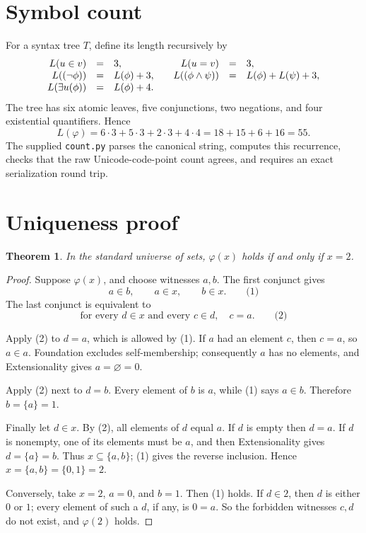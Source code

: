 \documentclass[10pt]{article}
\newtheorem{theorem}{Theorem}
\begin{document}
\section{Symbol count}

For a syntax tree $T$, define its length recursively by
\[
\begin{array}{rcl@{\qquad}rcl}
L(u\in v)&=&3, & L(u=v)&=&3,\\
L((\neg\phi))&=&L(\phi)+3,&
L((\phi\wedge\psi))&=&L(\phi)+L(\psi)+3,\\
L(\exists u(\phi))&=&L(\phi)+4.&&
\end{array}
\]
The tree has six atomic leaves, five conjunctions, two negations, and four
existential quantifiers.  Hence
\[
  L(\varphi)=6\cdot3+5\cdot3+2\cdot3+4\cdot4
             =18+15+6+16=\boxed{55}.
\]
The supplied \texttt{count.py} parses the canonical string, computes this
recurrence, checks that the raw Unicode-code-point count agrees, and requires
an exact serialization round trip.

\section{Uniqueness proof}

\begin{theorem}
In the standard universe of sets, $\varphi(x)$ holds if and only if $x=2$.
\end{theorem}

\begin{proof}
Suppose $\varphi(x)$, and choose witnesses $a,b$.  The first conjunct gives
\[
  a\in b,\qquad a\in x,\qquad b\in x. \qquad\text{(1)}
\]
The last conjunct is equivalent to
\[
  \text{for every }d\in x\text{ and every }c\in d,\quad c=a.
  \qquad\text{(2)}
\]

Apply (2) to $d=a$, which is allowed by (1).  If $a$ had an element $c$,
then $c=a$, so $a\in a$.  Foundation excludes self-membership; consequently
$a$ has no elements, and Extensionality gives $a=\varnothing=0$.

Apply (2) next to $d=b$.  Every element of $b$ is $a$, while (1) says
$a\in b$.  Therefore $b=\{a\}=1$.

Finally let $d\in x$.  By (2), all elements of $d$ equal $a$.  If $d$ is
empty then $d=a$.  If $d$ is nonempty, one of its elements must be $a$, and
then Extensionality gives $d=\{a\}=b$.  Thus $x\subseteq\{a,b\}$; (1) gives
the reverse inclusion.  Hence $x=\{a,b\}=\{0,1\}=2$.

Conversely, take $x=2$, $a=0$, and $b=1$.  Then (1) holds.  If $d\in2$,
then $d$ is either $0$ or $1$; every element of such a $d$, if any, is $0=a$.
So the forbidden witnesses $c,d$ do not exist, and $\varphi(2)$ holds.
\end{proof}
\end{document}
